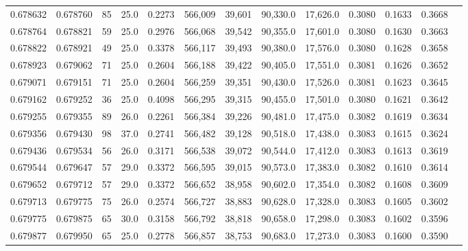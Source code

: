 \begin{tabular}{rrrrrrrrrrrrr}
0.678632 & 0.678760 &    85 & 25.0 &                                     0.2273 & 566,009 &  39,601 &  90,330.0 &  17,626.0 & 0.3080 & 0.1633 & 0.3668 \\
0.678764 & 0.678821 &    59 & 25.0 &                                     0.2976 & 566,068 &  39,542 &  90,355.0 &  17,601.0 & 0.3080 & 0.1630 & 0.3663 \\
0.678822 & 0.678921 &    49 & 25.0 &                                     0.3378 & 566,117 &  39,493 &  90,380.0 &  17,576.0 & 0.3080 & 0.1628 & 0.3658 \\
0.678923 & 0.679062 &    71 & 25.0 &                                     0.2604 & 566,188 &  39,422 &  90,405.0 &  17,551.0 & 0.3081 & 0.1626 & 0.3652 \\
0.679071 & 0.679151 &    71 & 25.0 &                                     0.2604 & 566,259 &  39,351 &  90,430.0 &  17,526.0 & 0.3081 & 0.1623 & 0.3645 \\
0.679162 & 0.679252 &    36 & 25.0 &                                     0.4098 & 566,295 &  39,315 &  90,455.0 &  17,501.0 & 0.3080 & 0.1621 & 0.3642 \\
0.679255 & 0.679355 &    89 & 26.0 &                                     0.2261 & 566,384 &  39,226 &  90,481.0 &  17,475.0 & 0.3082 & 0.1619 & 0.3634 \\
0.679356 & 0.679430 &    98 & 37.0 &                                     0.2741 & 566,482 &  39,128 &  90,518.0 &  17,438.0 & 0.3083 & 0.1615 & 0.3624 \\
0.679436 & 0.679534 &    56 & 26.0 &                                     0.3171 & 566,538 &  39,072 &  90,544.0 &  17,412.0 & 0.3083 & 0.1613 & 0.3619 \\
0.679544 & 0.679647 &    57 & 29.0 &                                     0.3372 & 566,595 &  39,015 &  90,573.0 &  17,383.0 & 0.3082 & 0.1610 & 0.3614 \\
0.679652 & 0.679712 &    57 & 29.0 &                                     0.3372 & 566,652 &  38,958 &  90,602.0 &  17,354.0 & 0.3082 & 0.1608 & 0.3609 \\
0.679713 & 0.679775 &    75 & 26.0 &                                     0.2574 & 566,727 &  38,883 &  90,628.0 &  17,328.0 & 0.3083 & 0.1605 & 0.3602 \\
0.679775 & 0.679875 &    65 & 30.0 &                                     0.3158 & 566,792 &  38,818 &  90,658.0 &  17,298.0 & 0.3083 & 0.1602 & 0.3596 \\
0.679877 & 0.679950 &    65 & 25.0 &                                     0.2778 & 566,857 &  38,753 &  90,683.0 &  17,273.0 & 0.3083 & 0.1600 & 0.3590 \\

\end{tabular}

